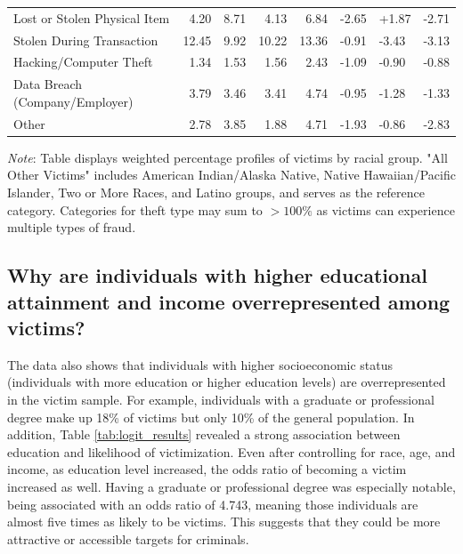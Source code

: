 \begin{table}[htbp]
\begin{threeparttable}
\begin{tabular}{@{} l *{4}{R} *{3}{P} @{}}
    \midrule
    Lost or Stolen Physical Item & 4.20 & 8.71 & 4.13 & 6.84 & -2.65 & +1.87 & -2.71 \\
    Stolen During Transaction & 12.45 & 9.92 & 10.22 & 13.36 & -0.91 & -3.43 & -3.13 \\
    Hacking/Computer Theft & 1.34 & 1.53 & 1.56 & 2.43 & -1.09 & -0.90 & -0.88 \\
    Data Breach (Company/Employer) & 3.79 & 3.46 & 3.41 & 4.74 & -0.95 & -1.28 & -1.33 \\
    Other & 2.78 & 3.85 & 1.88 & 4.71 & -1.93 & -0.86 & -2.83 \\
    \bottomrule
  \end{tabular}
  \begin{tablenotes}
    \item \textit{Note}: Table displays weighted percentage profiles of victims by racial group. "All Other Victims" includes American Indian/Alaska Native, Native Hawaiian/Pacific Islander, Two or More Races, and Latino groups, and serves as the reference category. Categories for theft type may sum to $>100\%$ as victims can experience multiple types of fraud.
  \end{tablenotes}
  \end{threeparttable}
\end{table}



\subsection{Why are individuals with higher educational attainment and income overrepresented among victims?}


The data also shows that individuals with higher socioeconomic status (individuals with more education or higher education levels) are overrepresented in the victim sample. For example, individuals with a graduate or professional degree make up 18\% of victims but only 10\% of the general population. In addition, Table \ref{tab:logit_results} revealed a strong association between education and likelihood of victimization. Even after controlling for race, age, and income, as education level increased, the odds ratio of becoming a victim increased as well. Having a graduate or professional degree was especially notable, being associated with an odds ratio of 4.743, meaning those individuals are almost five times as likely to be victims. This suggests that they could be more attractive or accessible targets for criminals.

